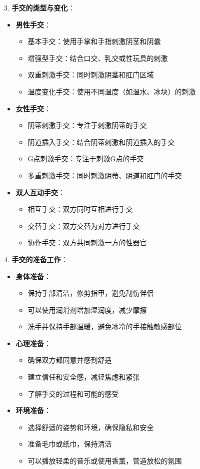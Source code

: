 \documentclass[12pt,UTF8]{ctexbook}
\begin{document}
3. \textbf{手交的类型与变化}：
\begin{itemize}
	\item \textbf{男性手交}：
	\begin{itemize}
		\item 基本手交：使用手掌和手指刺激阴茎和阴囊
		\item 增强型手交：结合口交、乳交或性玩具的刺激
		\item 双重刺激手交：同时刺激阴茎和肛门区域
		\item 温度变化手交：使用不同温度（如温水、冰块）的刺激
	\end{itemize}
	\item \textbf{女性手交}：
	\begin{itemize}
		\item 阴蒂刺激手交：专注于刺激阴蒂的手交
		\item 阴道插入手交：结合阴蒂刺激和阴道插入的手交
		\item G点刺激手交：专注于刺激G点的手交
		\item 多重刺激手交：同时刺激阴蒂、阴道和肛门的手交
	\end{itemize}
	\item \textbf{双人互动手交}：
	\begin{itemize}
		\item 相互手交：双方同时互相进行手交
		\item 交替手交：双方交替为对方进行手交
		\item 协作手交：双方共同刺激一方的性器官
	\end{itemize}
\end{itemize}

4. \textbf{手交的准备工作}：
\begin{itemize}
	\item \textbf{身体准备}：
	\begin{itemize}
		\item 保持手部清洁，修剪指甲，避免刮伤伴侣
		\item 可以使用润滑剂增加湿润度，减少摩擦
		\item 洗手并保持手部温暖，避免冰冷的手接触敏感部位
	\end{itemize}
	\item \textbf{心理准备}：
	\begin{itemize}
		\item 确保双方都同意并感到舒适
		\item 建立信任和安全感，减轻焦虑和紧张
		\item 了解手交的过程和可能的感受
	\end{itemize}
	\item \textbf{环境准备}：
	\begin{itemize}
		\item 选择舒适的姿势和环境，确保隐私和安全
		\item 准备毛巾或纸巾，保持清洁
		\item 可以播放轻柔的音乐或使用香薰，营造放松的氛围
	\end{itemize}
\end{itemize}
\end{document}
